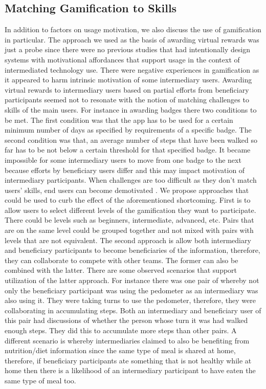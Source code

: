 \documentclass{sig-alternate}
\begin{document}
\subsection{Matching Gamification to Skills}
In addition to factors on usage motivation, we also discuss the use of gamification in particular. The approach we used as the basis of awarding virtual rewards was just a probe since there were no previous studies that had intentionally design systems with motivational affordances  that support usage in the context of intermediated technology use. There were negative experiences in  gamification as it  appeared to harm intrinsic motivation of some intermediary users. Awarding virtual rewards to intermediary users based on partial efforts from beneficiary participants seemed not to resonate with the notion of matching challenges to skills of the main users. For instance in awarding badges there two conditions to be met. The first condition was that the app has to be used for a certain minimum number of days as specified by requirements of a specific badge. The second condition was that, an average number of steps that have been walked so far has to be not below a certain threshold for that specified badge. It became impossible for some intermediary users to move from one badge to the next because efforts by beneficiary users differ and this may impact motivation of intermediary participants. When challenges are too difficult as they don't match users' skills, end users can become demotivated \cite{zhang2008:motivational}.\newline 
We propose approaches that could be used to curb the effect of the  aforementioned shortcoming. First is to allow users to select different levels of the gamification they want to participate. There could be levels such as beginners, intermediate, advanced, etc. Pairs that are on the same level could be grouped together and not mixed with pairs with levels that are not equivalent. The second approach is allow both intermediary and beneficiary participants to become beneficiaries of the information, therefore, they can collaborate to compete with other teams. The former can also be combined with the latter. There are some observed scenarios that support utilization of the latter approach. For instance there was one pair of whereby not only the beneficiary participant was using the pedometer as an intermediary was also using it. They were taking turns to use the pedometer, therefore, they were collaborating in accumulating steps. Both an intermediary and  beneficiary user of this pair had discussions of whether the person whose turn it was had walked enough steps. They did this to accumulate more steps than other pairs. A different scenario is whereby intermediaries claimed to also be benefiting from nutrition/diet information since the same type of meal is shared at home, therefore, if beneficiary participants ate something that is not healthy while at home then there is a likelihood of an intermediary participant to have eaten the same type of meal too.
\end{document}

